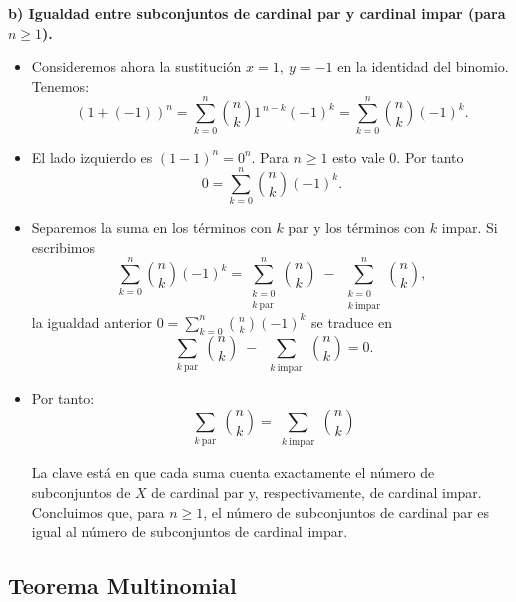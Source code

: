 \documentclass[a4paper,12pt]{article}
\begin{document}
\begin{ejercicio}[title=Ejercicio 23]

\textbf{b) Igualdad entre subconjuntos de cardinal par y cardinal impar (para \(n\ge1\)).}

\begin{itemize}
\item Consideremos ahora la sustitución \(x=1,\ y=-1\) en la identidad del binomio. Tenemos:
\[
(1+(-1))^{n}=\sum_{k=0}^{n}\binom{n}{k}1^{\,n-k}(-1)^{k}
=\sum_{k=0}^{n}\binom{n}{k}(-1)^{k}.
\]

\item El lado izquierdo es \((1-1)^{n}=0^{n}\). Para \(n\ge 1\) esto vale \(0\). Por tanto
\[
0=\sum_{k=0}^{n}\binom{n}{k}(-1)^{k}.
\]

\item Separemos la suma en los términos con \(k\) par y los términos con \(k\) impar. Si escribimos
\[
\sum_{k=0}^{n}\binom{n}{k}(-1)^{k}
=\sum_{\substack{k=0\\k\ \text{par}}}^{n}\binom{n}{k}
\;-\;
\sum_{\substack{k=0\\k\ \text{impar}}}^{n}\binom{n}{k},
\]
la igualdad anterior \(0=\sum_{k=0}^{n}\binom{n}{k}(-1)^{k}\) se traduce en
\[
\sum_{\substack{k\ \text{par}}}\binom{n}{k}
\;-\;
\sum_{\substack{k\ \text{impar}}}\binom{n}{k}
=0.
\]

\item Por tanto:
\[
\boxed{\sum_{\substack{k\ \text{par}}}\binom{n}{k}
=
\sum_{\substack{k\ \text{impar}}}\binom{n}{k}}
\]

La clave está en que cada suma cuenta exactamente el número de subconjuntos de \(X\) de cardinal par y, respectivamente, de cardinal impar. Concluimos que, para \(n\ge 1\), el número de subconjuntos de cardinal par es igual al número de subconjuntos de cardinal impar.
\end{itemize}
\end{ejercicio}

\subsection{Teorema Multinomial}
\end{document}
